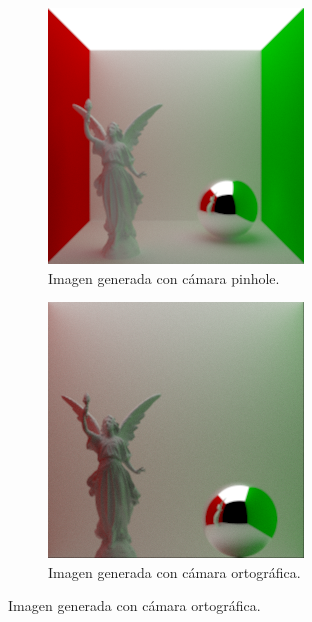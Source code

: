 \documentclass{article}
\begin{document}
\begin{figure}[H]
  \begin{subfigure}[h]{0.4\linewidth}
    \includegraphics[width=\linewidth]{imgs/lucy.png}
    \caption{Imagen generada con cámara pinhole.}
  \end{subfigure}
  \hfill
  \begin{subfigure}[h]{0.4\linewidth}
    \includegraphics[width=\linewidth]{imgs/lucy_o.png}
    \caption{Imagen generada con cámara ortográfica.}
  \end{subfigure}


\end{figure}
\end{document}
